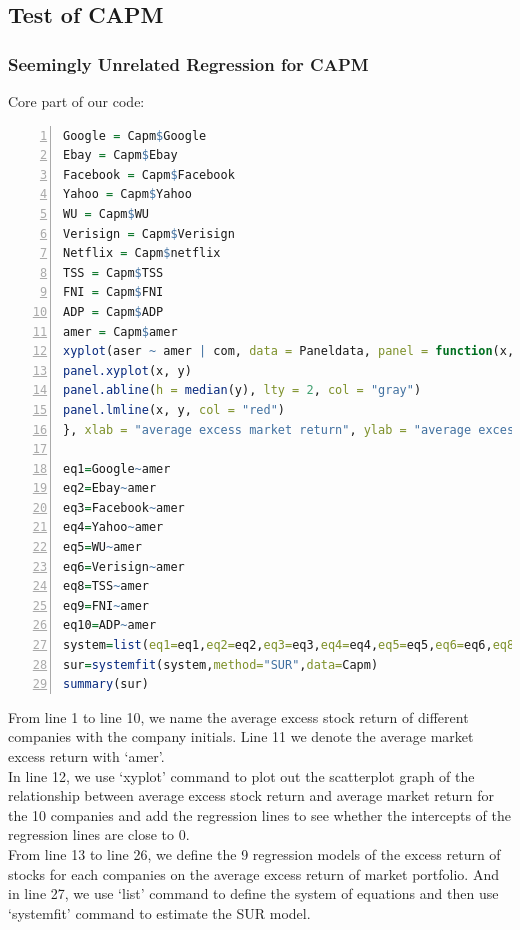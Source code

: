     \subsection{Test of CAPM}
    \subsubsection{Seemingly Unrelated Regression for CAPM}
    \noindent Core part of our code:\\
    \begin{lstlisting}[language=R,numbers=left, numberstyle=\normalsize]
Google = Capm$Google
Ebay = Capm$Ebay
Facebook = Capm$Facebook
Yahoo = Capm$Yahoo
WU = Capm$WU
Verisign = Capm$Verisign
Netflix = Capm$netflix
TSS = Capm$TSS
FNI = Capm$FNI
ADP = Capm$ADP
amer = Capm$amer
xyplot(aser ~ amer | com, data = Paneldata, panel = function(x, y) {
panel.xyplot(x, y)
panel.abline(h = median(y), lty = 2, col = "gray")
panel.lmline(x, y, col = "red")
}, xlab = "average excess market return", ylab = "average excess stock return", xlim = c(0, 2), ylim = c(0,5), main = "Excess market return and excess stock return")

eq1=Google~amer
eq2=Ebay~amer
eq3=Facebook~amer
eq4=Yahoo~amer
eq5=WU~amer
eq6=Verisign~amer
eq8=TSS~amer
eq9=FNI~amer
eq10=ADP~amer
system=list(eq1=eq1,eq2=eq2,eq3=eq3,eq4=eq4,eq5=eq5,eq6=eq6,eq8=eq8,eq9=eq9,eq10=eq10)
sur=systemfit(system,method="SUR",data=Capm)
summary(sur)

    \end{lstlisting}
    From line 1 to line 10, we name the average excess stock return of different companies with the company initials. Line 11 we denote the average market excess return with `amer'.\\
    [\baselineskip]\indent In line 12, we use `xyplot' command to plot out the scatterplot graph of the relationship between average excess stock return and average market return for the 10 companies and add the regression lines to see whether the intercepts of the regression lines are close to 0.\\
    [\baselineskip]\indent From line 13 to line 26, we define the 9 regression models of the excess return of stocks for each companies on the average excess return of market portfolio. And in line 27, we use `list' command to define the system of equations and then use `systemfit' command to estimate the SUR model.\\


